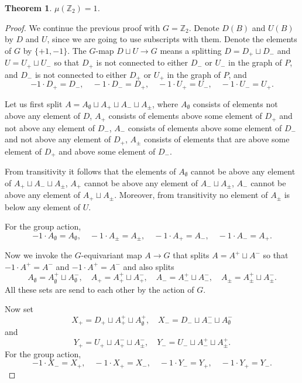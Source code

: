 \documentclass[preprint,12pt]{article}
\newtheorem{theorem}{Theorem}[section]
\theoremstyle{definition}
\theoremstyle{remark}
\numberwithin{equation}{section}
\begin{document}
\begin{theorem}
\label{thm: mu(Z_2)=1}
    $\mu(\mathbb{Z}_2)=1$.
\end{theorem}

\begin{proof}
We continue the previous proof with $G=\mathbb Z_2$. Denote $D(B)$ and $U(B)$ by $D$ and $U$, since we are going to use subscripts with them. Denote the elements of $G$ by $\{+1, -1\}$. The $G$-map $D\sqcup U\to G$ means a splitting $D=D_+\sqcup D_-$ and $U=U_+\sqcup U_-$ so that $D_+$ is not connected to either $D_-$ or $U_-$ in the graph of $P$, and $D_-$ is not connected to either $D_+$ or $U_+$ in the graph of $P$, and
    \[
    -1\cdot D_+=D_-, \quad -1\cdot D_-=D_+, \quad -1\cdot U_+=U_-, \quad -1\cdot U_-=U_+.
    \]
    
    Let us first split $A=A_\emptyset\sqcup A_+\sqcup A_-\sqcup A_\pm$, where $A_\emptyset$ consists of elements not above any element of $D$, $A_+$ consists of elements above some element of $D_+$ and not above any element of $D_-$, $A_-$ consists of elements above some element of $D_-$ and not above any element of $D_+$, $A_\pm$ consists of elements that are above some element of $D_+$ and above some element of $D_-$. 
    
    From transitivity it follows that the elements of $A_\emptyset$ cannot be above any element of $A_+\sqcup A_-\sqcup A_\pm$, $A_+$ cannot be above any element of $A_-\sqcup A_\pm$, $A_-$ cannot be above any element of $A_+\sqcup A_\pm$. Moreover, from transitivity no element of $A_\pm$ is below any element of $U$.   
    
    For the group action,
    \[
    -1\cdot A_\emptyset= A_\emptyset, \quad -1\cdot A_\pm= A_\pm, \quad -1\cdot A_+=A_-,\quad -1\cdot A_-=A_+.
    \]
    
    Now we invoke the $G$-equivariant map $A\to G$ that splits $A=A^+\sqcup A^-$ so that $-1\cdot A^+=A^-$ and $-1\cdot A^+=A^-$ and also splits
    \[
    A_\emptyset = A_\emptyset^+\sqcup A_\emptyset^-,\quad 
    A_+ = A_+^+\sqcup A_+^-,\quad A_- = A_-^+\sqcup A_-^-,\quad A_\pm = A_\pm^+\sqcup A_\pm^-.
    \]
    All these sets are send to each other by the action of $G$.
    
    Now set
    \[
    X_+ = D_+\sqcup A_+^+\sqcup A_\emptyset^+,\quad X_-=D_-\sqcup A_-^-\sqcup A_\emptyset^-
    \]
    and
    \[
    Y_+ = U_+\sqcup A_+^-\sqcup A_\pm^-,\quad Y_-=U_-\sqcup A_-^+\sqcup A_\pm^+.
    \]
    For the group action,
    \[
    -1\cdot X_-=X_+, \quad -1\cdot X_+=X_-,\quad -1\cdot Y_- = Y_+, \quad -1\cdot Y_+ = Y_-.
    \]


\end{proof}
\end{document}
